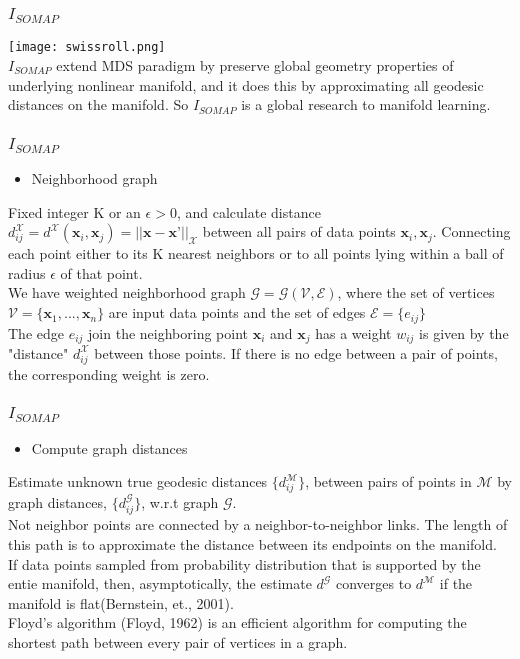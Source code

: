 \documentclass{beamer}
\begin{document}
\begin{frame}
\frametitle{$I_{SOMAP}$}
 \texttt{[image: swissroll.png]}\\
 $I_{SOMAP}$ extend MDS paradigm by preserve global geometry properties of underlying nonlinear manifold, and it does this by approximating all geodesic distances on the manifold. So $I_{SOMAP}$ is a global research to manifold learning. 
\end{frame}


\begin{frame}
\frametitle{$I_{SOMAP}$}
\begin{itemize}
  \item Neighborhood graph
\end{itemize}
Fixed integer K or an $\epsilon>0$, and calculate distance
$d_{ij}^{\mathcal{X}}=d^{\mathcal{X}}(\textbf{x}_i,\textbf{x}_j)=||\textbf{x}-\textbf{x'}||_{\mathcal{X}}$
between all pairs of data points $\textbf{x}_i,\textbf{x}_j$.
Connecting each point either to its K nearest neighbors or to all points lying within a ball of radius $\epsilon$ of that point.\\
We have weighted neighborhood graph $\mathcal{G}=\mathcal{G}(\mathcal{V},\mathcal{E})$, where the set of vertices $\mathcal{V}=\{\textbf{x}_1,...,\textbf{x}_n\}$ are input data points and the set of edges $\mathcal{E}=\{e_{ij}\}$\\
The edge $e_{ij}$ join the neighboring point $\textbf{x}_i$ and $\textbf{x}_j$ has a weight $w_{ij}$ is given by the "distance" $d_{ij}^{\mathcal{X}}$ between those points. If there is no edge between a pair of points, the corresponding weight is zero.
\end{frame}

\begin{frame}
\frametitle{$I_{SOMAP}$}
\begin{itemize}
  \item Compute graph distances
\end{itemize}
Estimate unknown true geodesic distances $\{d_{ij}^{\mathcal{M}}\}$, between pairs of points in $\mathcal{M}$ by graph distances, $\{d_{ij}^{\mathcal{G}}\}$, w.r.t graph $\mathcal{G}$.\\
Not neighbor points are connected by a neighbor-to-neighbor links. The length of this path is to approximate the distance between its endpoints on the manifold.\\
If data points sampled from probability distribution that is supported by the entie manifold, then, asymptotically, the estimate $d^{\mathcal{G}}$ converges to $d^{\mathcal{M}}$ if the manifold is flat(Bernstein, et., 2001).\\
Floyd's algorithm (Floyd, 1962) is an efficient algorithm for computing the shortest path between every pair of vertices in a graph.
\end{frame}
\end{document}
